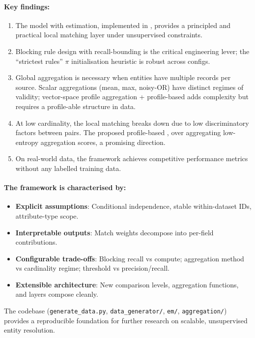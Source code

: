 \paragraph{Key findings:}
\begin{enumerate}
	\item The \fellegisunter{} model with \emalgo{} estimation, implemented in \splink{}, provides a principled and practical local matching layer under unsupervised constraints.
	\item Blocking rule design with recall-bounding is the critical engineering lever; the ``strictest rules'' $\pi$ initialisation heuristic is robust across configs.
	\item Global aggregation is necessary when entities have multiple records per source. Scalar aggregations (mean, max, noisy-OR) have distinct regimes of validity; vector-space profile aggregation + profile-based \splink{} adds complexity but requires a profile-able structure in data.
	\item At low cardinality, the local matching breaks down due to low discriminatory factors between pairs. The proposed profile-based \splink{}, over aggregating low-entropy aggregation scores, a promising direction.
	\item On real-world data, the framework achieves competitive performance metrics without any labelled training data.
\end{enumerate}

\paragraph{The framework is characterised by:}
\begin{itemize}
	\item \textbf{Explicit assumptions}: Conditional independence, stable within-dataset IDs, attribute-type scope.
	\item \textbf{Interpretable outputs}: Match weights decompose into per-field contributions.
	\item \textbf{Configurable trade-offs}: Blocking recall vs compute; aggregation method vs cardinality regime; threshold vs precision/recall.
	\item \textbf{Extensible architecture}: New comparison levels, aggregation functions, and layers compose cleanly.
\end{itemize}

The codebase (\texttt{generate\_data.py}, \texttt{data\_generator/}, \texttt{em/}, \texttt{aggregation/}) provides a reproducible foundation for further research on scalable, unsupervised entity resolution.

